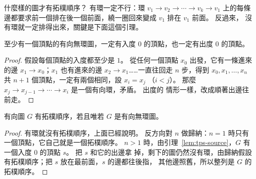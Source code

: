 \begin{center}
\label{fig:tps-g1}
\end{center}

什麼樣的圖才有拓樸順序？ 有環一定不行：環 $v_1 \to v_2 \to \cdots \to v_k \to v_1$
上的每條邊都要求前一個排在後一個前面，繞一圈回來變成 $v_1$ 排在 $v_1$ 前面。 反過來，
沒有環就一定排得出來，關鍵是下面這個引理。

\begin{lemma}
\label{lem:tps-source}
至少有一個頂點的有向無環圖，一定有入度 $0$ 的頂點，也一定有出度 $0$ 的頂點。
\end{lemma}

\begin{proof}
假設每個頂點的入度都至少是 $1$。 從任何一個頂點 $x_0$ 出發，它有一條進來的邊
$x_1 \to x_0$；$x_1$ 也有進來的邊 $x_2 \to x_1$……一直往回走 $n$ 步，得到
$x_0, x_1, \ldots, x_n$ 共 $n + 1$ 個頂點，一定有兩個相同，設 $x_i = x_j$
（$i < j$）。 那麼 $x_j \to x_{j-1} \to \cdots \to x_i$ 是一個有向環，矛盾。 出度的
情形一樣，改成順著出邊往前走。
\end{proof}

\begin{theorem}
\label{thm:tps-exists}
有向圖 $G$ 有拓樸順序，若且唯若 $G$ 是有向無環圖。
\end{theorem}

\begin{proof}
有環就沒有拓樸順序，上面已經說明。 反方向對 $n$ 做歸納：$n = 1$ 時只有一個頂點，它自己就是一個拓樸順序。 $n > 1$
時，由引理~\ref{lem:tps-source}，$G$ 有一個入度 $0$ 的頂點 $s$。 把 $s$ 和它的出邊拿
掉，剩下的圖仍然沒有環，由歸納假設有拓樸順序；把 $s$ 放在最前面，$s$ 的邊都往後指，
其他邊照舊，所以整列是 $G$ 的拓樸順序。
\end{proof}

